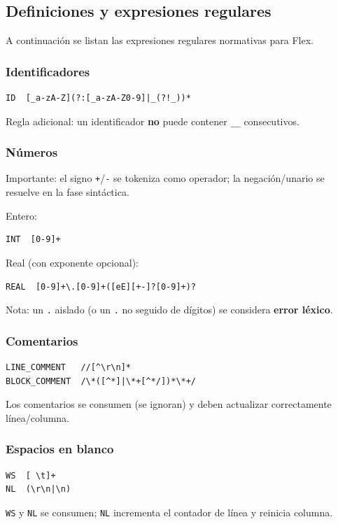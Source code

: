 \documentclass[12pt]{article}
\begin{document}
\subsection{Definiciones y expresiones regulares}
A continuación se listan las expresiones regulares normativas para Flex.

\subsubsection*{Identificadores}
\begin{verbatim}
ID  [_a-zA-Z](?:[_a-zA-Z0-9]|_(?!_))*
\end{verbatim}
Regla adicional: un identificador \textbf{no} puede contener \texttt{__} consecutivos.

\subsubsection*{Números}
Importante: el signo \texttt{+}/\texttt{-} se tokeniza como operador; la negación/unario se resuelve en la fase sintáctica.

Entero:
\begin{verbatim}
INT  [0-9]+
\end{verbatim}

Real (con exponente opcional):
\begin{verbatim}
REAL  [0-9]+\.[0-9]+([eE][+-]?[0-9]+)?
\end{verbatim}

Nota: un \texttt{.} aislado (o un \texttt{.} no seguido de dígitos) se considera \textbf{error léxico}.

\subsubsection*{Comentarios}
\begin{verbatim}
LINE_COMMENT   //[^\r\n]*
BLOCK_COMMENT  /\*([^*]|\*+[^*/])*\*+/
\end{verbatim}
Los comentarios se consumen (se ignoran) y deben actualizar correctamente línea/columna.

\subsubsection*{Espacios en blanco}
\begin{verbatim}
WS  [ \t]+
NL  (\r\n|\n)
\end{verbatim}
\texttt{WS} y \texttt{NL} se consumen; \texttt{NL} incrementa el contador de línea y reinicia columna.
\end{document}
